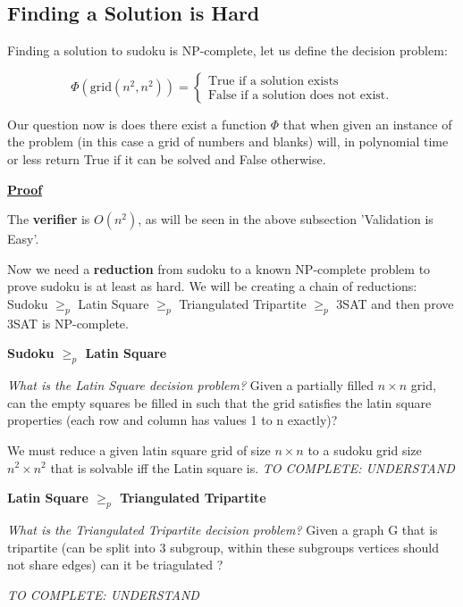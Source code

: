 \documentclass[a4paper,12pt]{article}
\begin{document}
	\subsection{Finding a Solution is Hard}
		
Finding a solution to sudoku is NP-complete, let us define the decision problem:

		\begin{equation}
		        \Phi (\text{grid}(n^2,n^2)) = \begin{cases}
		            \text{True if a solution exists} \\
		            \text{False if a solution does not exist}.
				\end{cases}
		\end{equation}

Our question now is does there exist a function $\Phi$ that when given an instance of the problem (in this case a grid of numbers and blanks) will, in polynomial time or less return True if it can be solved and False otherwise.

\textbf{\underline{Proof}}

The \textbf{verifier} is $O(n^2)$, as will be seen in the above subsection 'Validation is Easy'.

Now we need a \textbf{reduction} from sudoku to a known NP-complete problem to prove sudoku is at least as hard. We will be creating a chain of reductions: Sudoku $\geq_p$  Latin Square $\geq_p$  Triangulated Tripartite $\geq_p$  3SAT and then prove 3SAT is NP-complete.

\textbf{Sudoku $\geq_p$ Latin Square}

\textit{What is the Latin Square decision problem?} Given a partially filled $n \times n$ grid, can the empty squares be filled in such that the grid satisfies the latin square properties (each row and column has values 1 to n exactly)?

We must reduce a given latin square grid of size $n \times n$ to a sudoku grid size $n^2 \times n^2$ that is solvable iff the Latin square is. \textit{TO COMPLETE: UNDERSTAND \cite{Complexity}}

\textbf{Latin Square $\geq_p$ Triangulated Tripartite}

\textit{What is the Triangulated Tripartite decision problem?} Given a graph G that is tripartite (can be split into 3 subgroup, within these subgroups vertices should not share edges) can it be triagulated ?

 \textit{TO COMPLETE: UNDERSTAND \cite{latin to tripartite}}
\end{document}
